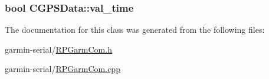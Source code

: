 \label{classCGPSData_a4cb88aa6709b11e2726ff08abf657601}
\hypertarget{classCGPSData_a5ef2d271e3356ee58b5dfdf9a0924a0a}{
\subsubsection[{val\_\-time}]{\setlength{\rightskip}{0pt plus 5cm}bool {\bf CGPSData::val\_\-time}}}
\label{classCGPSData_a5ef2d271e3356ee58b5dfdf9a0924a0a}


The documentation for this class was generated from the following files:\begin{DoxyCompactItemize}
\item 
garmin-\/serial/\hyperlink{RPGarmCom_8h}{RPGarmCom.h}\item 
garmin-\/serial/\hyperlink{RPGarmCom_8cpp}{RPGarmCom.cpp}\end{DoxyCompactItemize}
